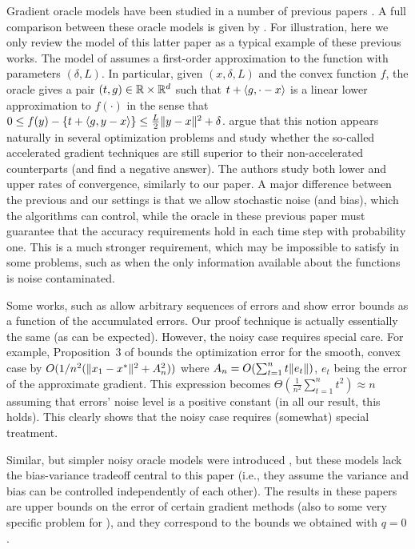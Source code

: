 Gradient oracle models have been studied in a number of previous papers 
\citep{dAsp08,Baes09,SchRoBa11,DeGliNe14}.
A full comparison between these oracle models is given by \citet{DeGliNe14}.
For illustration, here we only review the model of this latter paper as a typical example of these previous works.
The model of \citet{DeGliNe14} assumes a first-order approximation to the function
with parameters $(\delta,L)$. In particular, 
given $(x,\delta,L)$ and the convex function $f$, 
the oracle gives a pair $(t,g)\in \mathbb{R} \times \mathbb{R}^d$
such that $t + \langle g,\cdot-x \rangle$ is a linear lower approximation to $f(\cdot)$ in the sense that 
$0\le f(y) - \left\{ t+ \langle g,y-x \rangle\right\} \le \frac{L}{2} \|y-x\|^2 + \delta$.
\citet{DeGliNe14} argue that this notion appears naturally in several optimization problems and study whether the so-called accelerated gradient techniques are still superior to their non-accelerated counterparts (and find a negative answer).
The authors study both lower and upper rates of convergence, similarly to our paper.
A major difference between the previous and our settings is that we allow stochastic noise (and bias), which the algorithms can control, while the oracle in these previous paper must guarantee that the accuracy requirements hold in each time step
with probability one.
This is a much stronger requirement, which may be impossible to satisfy in some problems, such as when 
the only information available about the functions is noise contaminated.

Some works, such as \citet{SchRoBa11} allow arbitrary sequences of errors and show error bounds as a function
of the accumulated errors. 
Our proof technique is actually essentially the same (as can be expected).
However, the noisy case requires special care. For example, Proposition~3 of
\citet{SchRoBa11}  bounds the optimization error for the smooth, convex case by 
$O(1/n^2 ( \|x_1-x^*\|^2 + A_n^2 ))$ where $A_n = O( \sum_{t=1}^n t \|e_t\|)$, $e_t$ being the error of the approximate gradient. This expression becomes $\Theta(\frac{1}{n^2} \sum_{t=1}^n t^2)  \approx n$
assuming that errors' noise level is a positive constant (in all our result, this holds).
This clearly shows that the noisy case requires (somewhat) special treatment.

Similar, but simpler noisy oracle models were introduced \citep{JN11a,Hon12,DvoGa15}, but these models lack the bias-variance tradeoff central to this paper (i.e., they assume the variance and bias can be controlled independently of each other). The results in these papers are upper bounds on the error of certain gradient methods (also to some very specific problem for \cite{Hon12}), and they correspond to the bounds we obtained with $q=0$.
